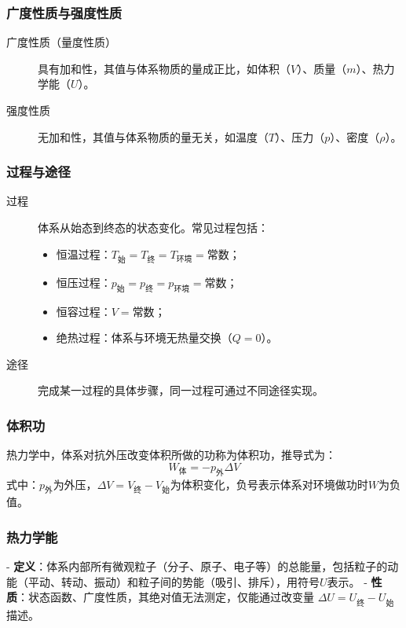 \subsubsection{广度性质与强度性质}
\begin{description}
    \item[广度性质（量度性质）] 具有加和性，其值与体系物质的量成正比，如体积（$V$）、质量（$m$）、热力学能（$U$）。
    \item[强度性质] 无加和性，其值与体系物质的量无关，如温度（$T$）、压力（$p$）、密度（$\rho$）。
\end{description}

\subsubsection{过程与途径}
\begin{description}
    \item[过程] 体系从始态到终态的状态变化。常见过程包括：
        \begin{itemize}
            \item 恒温过程：$T_{\text{始}} = T_{\text{终}} = T_{\text{环境}} = \text{常数}$；
            \item 恒压过程：$p_{\text{始}} = p_{\text{终}} = p_{\text{环境}} = \text{常数}$；
            \item 恒容过程：$V = \text{常数}$；
            \item 绝热过程：体系与环境无热量交换（$Q = 0$）。
        \end{itemize}
    \item[途径] 完成某一过程的具体步骤，同一过程可通过不同途径实现。
\end{description}

\subsubsection{体积功}
热力学中，体系对抗外压改变体积所做的功称为体积功，推导式为：
\[
W_{\text{体}} = -p_{\text{外}} \Delta V
\]
式中：$p_{\text{外}}$为外压，$\Delta V=V_\text{终}-V_\text{始}$为体积变化，负号表示体系对环境做功时$W$为负值。

\subsubsection{热力学能}
- \textbf{定义}：体系内部所有微观粒子（分子、原子、电子等）的总能量，包括粒子的动能（平动、转动、振动）和粒子间的势能（吸引、排斥），用符号$U$表示。  
- \textbf{性质}：状态函数、广度性质，其绝对值无法测定，仅能通过改变量 $\Delta U=U_\text{终}-U_\text{始}$ 描述。

